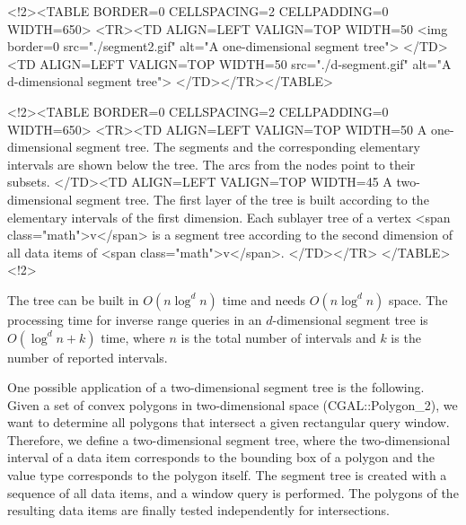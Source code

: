 \begin{ccHtmlOnly}
    <!2><TABLE BORDER=0 CELLSPACING=2 CELLPADDING=0 WIDTH=650>
        <TR><TD ALIGN=LEFT VALIGN=TOP WIDTH=50%
    <img border=0 src="./segment2.gif" alt="A one-dimensional segment
tree">
    </TD>
    <TD ALIGN=LEFT VALIGN=TOP WIDTH=50%
src="./d-segment.gif" alt="A
    d-dimensional segment tree">
      </TD></TR></TABLE>

        <!2><TABLE BORDER=0 CELLSPACING=2 CELLPADDING=0 WIDTH=650>
        <TR><TD ALIGN=LEFT VALIGN=TOP WIDTH=50%
A one-dimensional segment
  tree. The segments and the corresponding elementary intervals
  are shown below the tree. The arcs from the nodes point to
  their subsets.
 </TD><TD ALIGN=LEFT VALIGN=TOP WIDTH=45%
A two-dimensional segment
  tree. The first layer of the tree is built according to the
  elementary intervals of the first dimension. Each
  sublayer tree of a vertex  <span class="math">v</span> is a segment tree according to
  the  second dimension of all data items of  <span class="math">v</span>.
 </TD></TR>
        </TABLE><!2>

\end{ccHtmlOnly}
The tree can be built in  $O(n\log^{d} n)$ time and
needs  $O(n\log^{d} n)$ space.
The  processing time for inverse range
queries in an $d$-dimensional segment tree is $O(\log^d n
+k)$ time, where $n$ is the total number of intervals and $k$ is
the number of reported intervals.

One possible application of a two-dimensional segment tree is the
following. Given a set of convex polygons in two-dimensional
space (CGAL::Polygon\_2), we want to determine all polygons
that intersect a given rectangular query window. Therefore, we define a
two-dimensional segment tree, where the two-dimensional interval of
a data item corresponds to the  bounding box of a polygon and the
value type corresponds to the polygon itself. The segment tree is created
with a sequence of all data items, and a window query is
performed. The polygons of the resulting data items are finally
tested independently for intersections.


